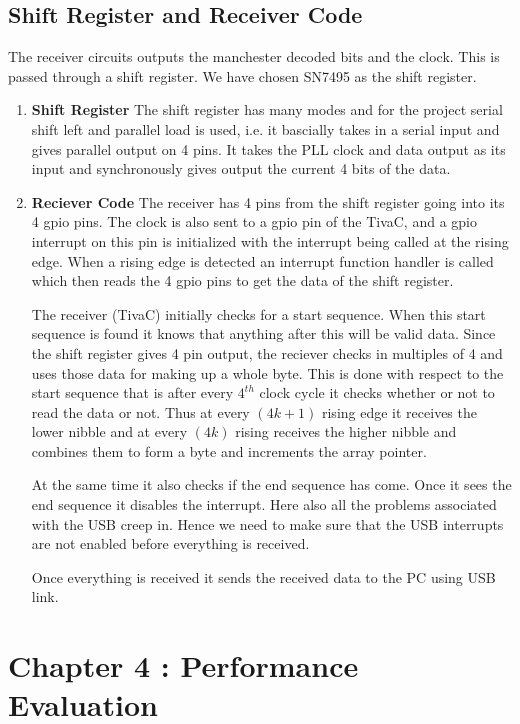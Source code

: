 \documentclass{article}
\begin{document}
\subsection{Shift Register and Receiver Code}
The receiver circuits outputs the manchester decoded bits and the clock. This is passed through a shift register. We have chosen SN7495 as the shift register. 
\begin{enumerate}
\item \textbf{Shift Register}
  The shift register has many modes and for the project serial shift left and parallel load is used, i.e. it bascially takes in a serial input and gives parallel output on 4 pins. It takes the PLL clock and data output as its input and synchronously gives output the current 4 bits of the data.
\item \textbf{Reciever Code}
  The receiver has 4 pins from the shift register going into its 4 gpio pins. The clock is also sent to a gpio pin of the TivaC, and a gpio interrupt on this pin is initialized with the interrupt being called at the rising edge. When a rising edge is detected an interrupt function handler is called which then reads the 4 gpio pins to get the data of the shift register. 
  
  The receiver (TivaC) initially checks for a start sequence. When this start sequence is found it knows that anything after this will be valid data. Since the shift register gives 4 pin output, the reciever checks in multiples of 4 and uses those data for making up a whole byte. This is done with respect to the start sequence that is after every $4^{th}$ clock cycle it checks whether or not to read the data or not. Thus at every $(4k+1)$ rising edge it receives the lower nibble and at every $(4k)$ rising receives the higher nibble and combines them to form a byte and increments the array pointer.  

  At the same time it also checks if the end sequence has come. Once it sees the end sequence it disables the interrupt. Here also all the problems associated with the USB creep in. Hence we need to make sure that the USB interrupts are not enabled before everything is received.

  Once everything is received it sends the received data to the PC using USB link.
\end{enumerate}



\section{Chapter 4 : Performance Evaluation}
\end{document}

